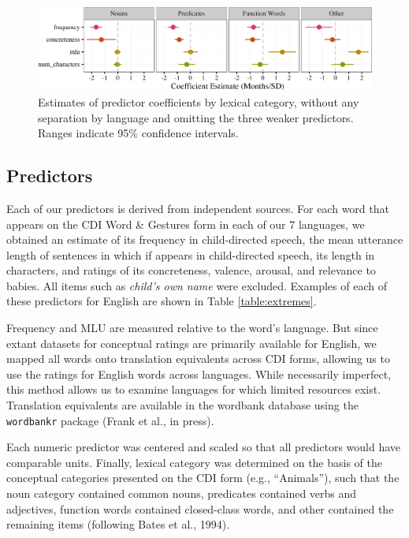 \documentclass[10pt, letterpaper]{article}
\newenvironment{CodeChunk}{}{}
\begin{document}
\begin{CodeChunk}
\begin{figure}[tb]

{\centering \includegraphics{figs/coefs_lexcat-1} 

}

\caption[Estimates of predictor coefficients by lexical category, without any separation by language and omitting the three weaker predictors]{Estimates of predictor coefficients by lexical category, without any separation by language and omitting the three weaker predictors. Ranges indicate 95\% confidence intervals.}\label{fig:coefs_lexcat}
\end{figure}
\end{CodeChunk}

\subsection{Predictors}\label{predictors}

Each of our predictors is derived from independent sources. For each
word that appears on the CDI Word \& Gestures form in each of our 7
languages, we obtained an estimate of its frequency in child-directed
speech, the mean utterance length of sentences in which if appears in
child-directed speech, its length in characters, and ratings of its
concreteness, valence, arousal, and relevance to babies. All items such
as \emph{child's own name} were excluded. Examples of each of these
predictors for English are shown in Table \ref{table:extremes}.

Frequency and MLU are measured relative to the word's language. But
since extant datasets for conceptual ratings are primarily available for
English, we mapped all words onto translation equivalents across CDI
forms, allowing us to use the ratings for English words across
languages. While necessarily imperfect, this method allows us to examine
languages for which limited resources exist. Translation equivalents are
available in the wordbank database using the \texttt{wordbankr} package
(Frank et al., in press).

Each numeric predictor was centered and scaled so that all predictors
would have comparable units. Finally, lexical category was determined on
the basis of the conceptual categories presented on the CDI form (e.g.,
``Animals''), such that the noun category contained common nouns,
predicates contained verbs and adjectives, function words contained
closed-class words, and other contained the remaining items (following
Bates et al., 1994).
\end{document}
